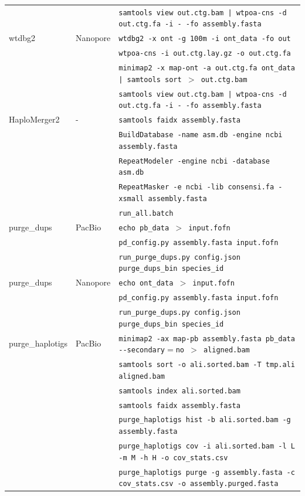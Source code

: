 \begin{table}[ht]
{\begin{tabular}{lll}
    & & \texttt{samtools view out.ctg.bam | wtpoa-cns -d out.ctg.fa -i - -fo assembly.fasta} \\
wtdbg2 & Nanopore & \texttt{wtdbg2 -x ont -g 100m -i ont\_data -fo out} \\
    & & \texttt{wtpoa-cns -i out.ctg.lay.gz -o out.ctg.fa} \\
    & & \texttt{minimap2 -x map-ont -a out.ctg.fa ont\_data | samtools sort $>$ out.ctg.bam} \\
    & & \texttt{samtools view out.ctg.bam | wtpoa-cns -d out.ctg.fa -i - -fo assembly.fasta} \\
HaploMerger2 & - & \texttt{samtools faidx assembly.fasta} \\
 &  & \texttt{BuildDatabase -name asm.db -engine ncbi assembly.fasta} \\
 &  & \texttt{RepeatModeler -engine ncbi -database asm.db} \\
  &  & \texttt{RepeatMasker -e ncbi -lib consensi.fa -xsmall assembly.fasta} \\
  &  & \texttt{run\_all.batch} \\
purge\_dups & PacBio & \texttt{echo pb\_data $>$ input.fofn} \\ 
 &  & \texttt{pd\_config.py assembly.fasta input.fofn} \\ 
 &  & \texttt{run\_purge\_dups.py config.json purge\_dups\_bin species\_id} \\ 
purge\_dups & Nanopore & \texttt{echo ont\_data $>$ input.fofn} \\ 
 &  & \texttt{pd\_config.py assembly.fasta input.fofn} \\ 
 &  & \texttt{run\_purge\_dups.py config.json purge\_dups\_bin species\_id} \\ 
purge\_haplotigs & PacBio & \texttt{minimap2 -ax map-pb assembly.fasta pb\_data -{}-secondary$=$no $>$ aligned.bam} \\
    & & \texttt{samtools sort -o ali.sorted.bam -T tmp.ali aligned.bam} \\
    & & \texttt{samtools index ali.sorted.bam} \\
    & & \texttt{samtools faidx assembly.fasta} \\
    & & \texttt{purge\_haplotigs hist -b ali.sorted.bam -g assembly.fasta} \\
    & & \texttt{purge\_haplotigs cov -i ali.sorted.bam -l L -m M -h H -o cov\_stats.csv}\\
    & & \texttt{purge\_haplotigs purge -g assembly.fasta -c cov\_stats.csv -o assembly.purged.fasta}\\

\end{tabular}}
\end{table}
